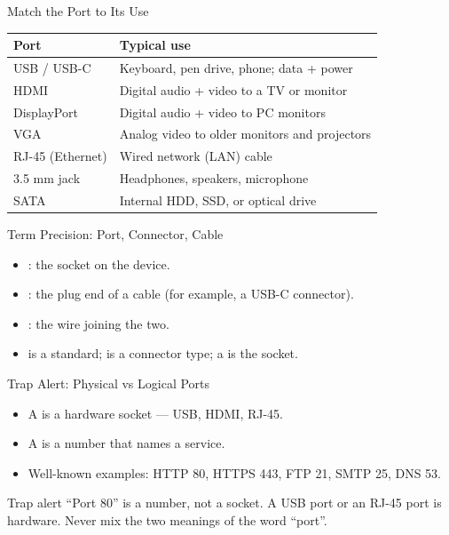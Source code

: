 \documentclass[aspectratio=169]{beamer}
\begin{document}
\begin{frame}{Match the Port to Its Use}
  \begin{center}
    \begin{tabular}{p{}p{}}
      \toprule
      \textbf{Port} & \textbf{Typical use} \\
      \midrule
      USB / USB-C & Keyboard, pen drive, phone; data + power \\
      HDMI & Digital audio + video to a TV or monitor \\
      DisplayPort & Digital audio + video to PC monitors \\
      VGA & Analog video to older monitors and projectors \\
      RJ-45 (Ethernet) & Wired network (LAN) cable \\
      3.5 mm jack & Headphones, speakers, microphone \\
      SATA & Internal HDD, SSD, or optical drive \\
      \bottomrule
    \end{tabular}
  \end{center}
\end{frame}

\begin{frame}{Term Precision: Port, Connector, Cable}
  \begin{itemize}
    \item {}: the socket on the device.
    \item {}: the plug end of a cable (for example, a USB-C
      connector).
    \item {}: the wire joining the two.
    \item {} is a standard;  is a connector type; a
       is the socket.
  \end{itemize}
  \vspace{0.25cm}
\end{frame}

\begin{frame}{Trap Alert: Physical vs Logical Ports}
  \begin{itemize}
    \item A  is a hardware socket --- USB, HDMI, RJ-45.
    \item A  is a number that names a service.
    \item Well-known examples: HTTP 80, HTTPS 443, FTP 21, SMTP 25, DNS 53.
  \end{itemize}
  \begin{alertblock}{Trap alert}
    ``Port 80'' is a number, not a socket. A USB port or an RJ-45 port is
    hardware. Never mix the two meanings of the word ``port''.
  \end{alertblock}
\end{frame}
\end{document}
